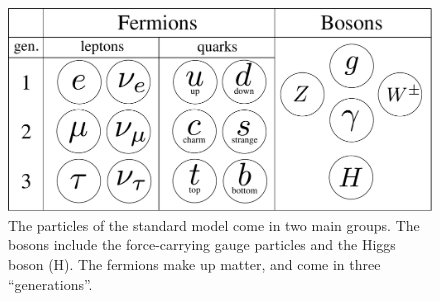 \begin{figure}[!htb]
    \centering
    \includegraphics[width=.6\textwidth]{figurer/standard_model.pdf}
    \caption{
        The particles of the standard model come in two main groups.
        The bosons include the force-carrying gauge particles and the Higgs boson (H).
        The fermions make up matter, and come in three ``generations''.
    }
    \label{fig: standard model}
\end{figure}


